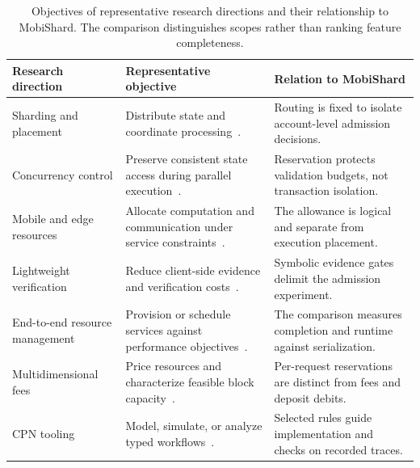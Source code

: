\begin{table}[t]
\caption{Objectives of representative research directions and their
relationship to MobiShard. The comparison distinguishes scopes rather
than ranking feature completeness.}
\label{tab:position}
\centering
\footnotesize
\setlength{\tabcolsep}{3pt}
\renewcommand{\arraystretch}{1.12}

\begin{tabularx}{\columnwidth}{@{}
  >{\raggedright\arraybackslash}p{}
  >{\raggedright\arraybackslash}X
  >{\raggedright\arraybackslash}X@{}}
\toprule
Research direction &
Representative objective &
Relation to MobiShard \\
\midrule

Sharding and placement &
Distribute state and coordinate
processing~\cite{sharper,txallo,gridb}. &
Routing is fixed to isolate account-level admission decisions. \\
\addlinespace[2pt]

Concurrency control &
Preserve consistent state access during parallel
execution~\cite{prophet,blockstm}. &
Reservation protects validation budgets, not transaction isolation. \\
\addlinespace[2pt]

Mobile and edge resources &
Allocate computation and communication under service
constraints~\cite{qin,wang}. &
The allowance is logical and separate from execution placement. \\
\addlinespace[2pt]

Lightweight verification &
Reduce client-side evidence and verification
costs~\cite{flyclient,plumo}. &
Symbolic evidence gates delimit the admission experiment. \\
\addlinespace[2pt]

End-to-end resource management &
Provision or schedule services against performance
objectives~\cite{inferline,clockwork,sinan}. &
The comparison measures completion and runtime against serialization. \\
\addlinespace[2pt]

Multi\-dimensional fees &
Price resources and characterize feasible block
capacity~\cite{dynamicfees,optimalfees,needfees}. &
Per-request reservations are distinct from fees and deposit debits. \\
\addlinespace[2pt]

CPN tooling &
Model, simulate, or analyze typed
workflows~\cite{cpnide,simpn,cpnpy}. &
Selected rules guide implementation and checks on recorded traces. \\

\bottomrule
\end{tabularx}
\end{table}

